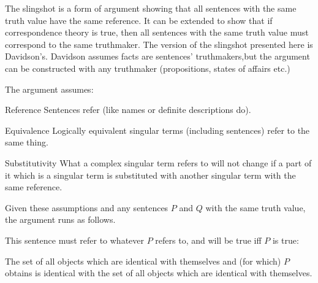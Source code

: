The slingshot is a form of argument showing that all sentences with the same truth value have the same reference. %
It can be extended to show that if correspondence theory is true, then all sentences with the same truth value must correspond to the same truthmaker.
The version of the slingshot presented here is Davidson's.
\parencite[753]{Davidson_1969}
Davidson assumes facts are sentences' truthmakers,\footnotemark but the argument can be constructed with any truthmaker (propositions, states of affairs etc.)
\parencite[752]{Davidson_1969}

The argument assumes:
\parencite[753]{Davidson_1969}

	\begin{principle}{Reference}\label{srefer}
	Sentences refer (like names or definite descriptions do).
	\end{principle}

	\begin{principle}{Equivalence}\label{sameref}
	Logically equivalent singular terms (including sentences) refer to the same thing.
	\end{principle}

	\begin{principle}{Substitutivity}\label{constref}
	What a complex singular term refers to will not change if a part of it which is a singular term is substituted with another singular term with the same reference.
	\end{principle}


Given these assumptions and any sentences $P$ and $Q$ with the same truth value, the argument runs as follows.

This sentence must refer to whatever $P$ refers to, and will be true iff $P$ is true:

	\begin{example}\label{setP}
	The set of all objects which are identical with themselves and (for which) $P$ obtains is identical with the set of all objects which are identical with themselves.
	\end{example}

